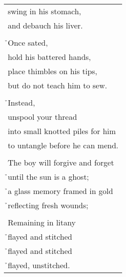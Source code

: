 \documentclass{article}
\begin{document}
\begin{center}
\begin{longtable}{l}
swing in his stomach, \\
and debauch his liver. \\
\\
\h{}Once sated, \\
hold his battered hands, \\
place thimbles on his tips, \\
but do not teach him to sew. \\
\\
\h{}Instead, \\
unspool your thread \\
into small knotted piles for him \\
to untangle before he can mend. \\
\\
The boy will forgive and forget \\
\h{}until the sun is a ghost; \\
\h{}a glass memory framed in gold \\
\h{}reflecting fresh wounds; \\
\\
Remaining in litany \\
\h{}flayed and stitched \\
\h{}flayed and stitched \\
\h{}flayed, unstitched. \\
\end{longtable}
\end{center}
\end{document}
